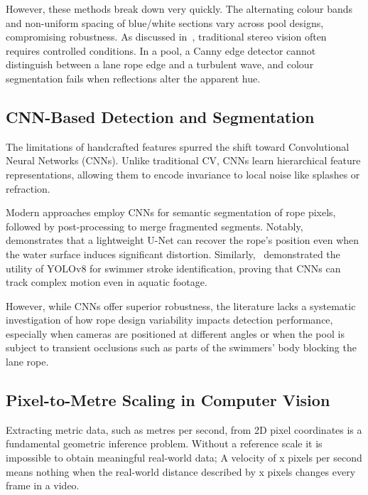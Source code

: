 \documentclass[conference]{IEEEtran}
\begin{document}
However, these methods break down very quickly. The alternating colour bands and non-uniform spacing of blue/white sections vary across pool designs, compromising robustness. As discussed in~\cite{holzmann2012}, traditional stereo vision often requires controlled conditions. In a pool, a Canny edge detector cannot distinguish between a lane rope edge and a turbulent wave, and colour segmentation fails when reflections alter the apparent hue.

\subsection{CNN-Based Detection and Segmentation}

The limitations of handcrafted features spurred the shift toward Convolutional Neural Networks (CNNs). Unlike traditional CV, CNNs learn hierarchical feature representations, allowing them to encode invariance to local noise like splashes or refraction.

Modern approaches employ CNNs for semantic segmentation of rope pixels, followed by post-processing to merge fragmented segments. Notably,~\cite{tran2024} demonstrates that a lightweight U-Net can recover the rope's position even when the water surface induces significant distortion. Similarly,~\cite{almajnoni2025} demonstrated the utility of YOLOv8 for swimmer stroke identification, proving that CNNs can track complex motion even in aquatic footage.

However, while CNNs offer superior robustness, the literature lacks a systematic investigation of how rope design variability impacts detection performance, especially when cameras are positioned at different angles or when the pool is subject to transient occlusions such as parts of the swimmers' body blocking the lane rope.

\subsection{Pixel-to-Metre Scaling in Computer Vision}

Extracting metric data, such as metres per second, from 2D pixel coordinates is a fundamental geometric inference problem. Without a reference scale it is impossible to obtain meaningful real-world data; A velocity of x pixels per second means nothing when the real-world distance described by x pixels changes every frame in a video.
\end{document}

